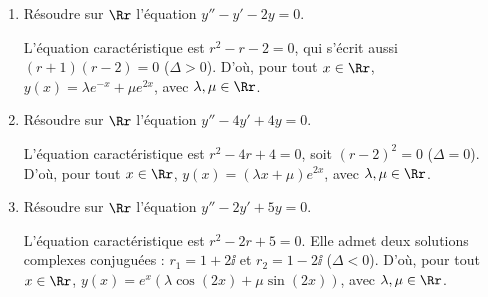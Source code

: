\documentclass[class=report,crop=false]{standalone}
\begin{document}
\begin{exemple}
\sauteligne
\begin{enumerate}
  \item Résoudre sur $\Rr$ l'équation $y'' - y' - 2y = 0$.

L'équation caractéristique est $r^2 - r - 2 = 0$,  qui s'écrit aussi $(r+1)(r-2) = 0$ ($\Delta >0$).
D'où, pour tout $x \in \Rr$, $y(x) = \lambda e^{-x} + \mu e^{2x}$,
avec $\lambda,\mu \in \Rr$.

  \item Résoudre sur $\Rr$ l'équation $y'' - 4y' + 4y = 0$.

L'équation caractéristique est $r^2 - 4r + 4 = 0$,
soit $(r-2)^2 = 0$ ($\Delta=0$). D'où, pour tout $x \in \Rr$,
$y(x) = (\lambda x + \mu) e^{2x}$, avec $\lambda,\mu \in \Rr$.

  \item Résoudre sur $\Rr$ l'équation $y'' - 2y' + 5y = 0$.

L'équation caractéristique est $r^2-2r+5 = 0$.
Elle admet deux solutions complexes conjuguées :
$r_1 = 1 + 2\ii$ et $r_2 = 1 - 2\ii$ ($\Delta<0$).
D'où, pour tout $x \in \Rr$,
$y(x) = e^x (\lambda \cos(2x) + \mu \sin(2x))$, avec $\lambda, \mu \in \Rr$.
\end{enumerate}
\end{exemple}
\end{document}
